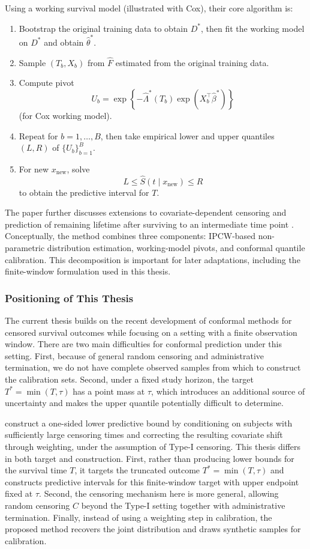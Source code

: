 \documentclass[12pt]{article}
\makeatletter
\let\thesis@subsection\subsubsection
\renewcommand{\subsection}{\thesis@subsection}
\makeatother
\begin{document}
Using a working survival model (illustrated with Cox), their core algorithm is:
\begin{enumerate}
\item Bootstrap the original training data to obtain $D^\ast$, then fit the working model on $D^\ast$ and obtain $\widehat\theta^\ast$.
\item Sample $(T_b,X_b)$ from $\widehat F$ estimated from the original training data.
\item Compute pivot
\[
U_b=\exp\!\left\{-\widehat\Lambda^\ast(T_b)\exp(X_b^\top\widehat\beta^\ast)\right\}
\]
(for Cox working model).
\item Repeat for $b=1,\ldots,B$, then take empirical lower and upper quantiles $(L,R)$ of $\{U_b\}_{b=1}^B$.
\item For new $x_{\mathrm{new}}$, solve
\[
L\le \widehat S(t\mid x_{\mathrm{new}})\le R
\]
to obtain the predictive interval for $T$.
\end{enumerate}
The paper further discusses extensions to covariate-dependent censoring and prediction of remaining lifetime after surviving to an intermediate time point \citep{qin2025conformal}.
Conceptually, the method combines three components: IPCW-based non-parametric distribution estimation, working-model pivots, and conformal quantile calibration.
This decomposition is important for later adaptations, including the finite-window formulation used in this thesis.



\subsection{Positioning of This Thesis}

The current thesis builds on the recent development of conformal methods for censored survival outcomes while focusing on a setting with a finite observation window. There are two main difficulties for conformal prediction under this setting. First, because of general random censoring and administrative termination, we do not have complete observed samples from which to construct the calibration sets. Second, under a fixed study horizon, the target $T^*=\min(T,\tau)$ has a point mass at $\tau$, which introduces an additional source of uncertainty and makes the upper quantile potentially difficult to determine. 

\citet{candes2023conformalized} construct a one-sided lower predictive bound by conditioning on subjects with sufficiently large censoring times and correcting the resulting covariate shift through weighting, under the assumption of Type-I censoring. This thesis differs in both target and construction. First, rather than producing lower bounds for the survival time $T$, it targets the truncated outcome $T^*=\min(T,\tau)$ and constructs predictive intervals for this finite-window target with upper endpoint fixed at $\tau$. Second, the censoring mechanism here is more general, allowing random censoring $C$ beyond the Type-I setting together with administrative termination. Finally, instead of using a weighting step in calibration, the proposed method recovers the joint distribution and draws synthetic samples for calibration.
\end{document}
